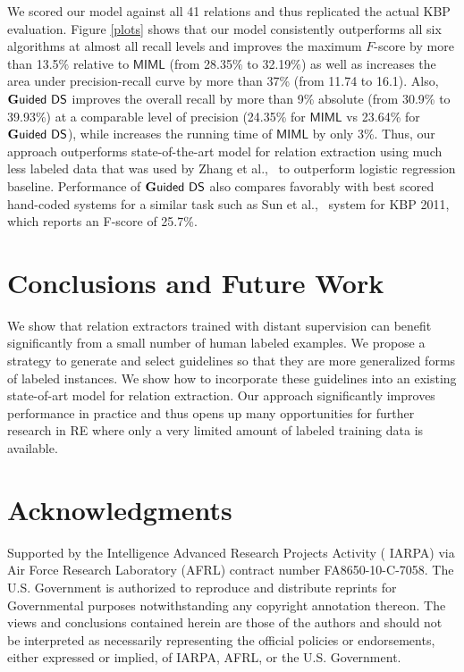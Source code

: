 \documentclass[11pt]{article}
\begin{document}
We scored our model against all 41 relations and thus replicated the actual KBP evaluation. 
Figure \ref{plots} shows that our model consistently outperforms all six algorithms at almost all recall levels and 
improves the maximum $F$-score by more than 13.5$\%$ relative to $\mathsf{MIML}$ (from 28.35$\%$
to 32.19$\%$) as well as increases the area under precision-recall curve by more than 37\% (from 11.74 to 16.1).
Also, $\mathsf{{\bf G}uided\ DS}$ improves the overall recall by more than 9\% absolute 
(from 30.9\% to 39.93\%) at a comparable level of precision 
(24.35\% for $\mathsf{MIML}$ vs 23.64\% for  $\mathsf{{\bf G}uided\ DS}$), while increases the running time of $\mathsf{MIML}$ by only 3\%.
Thus, our approach outperforms state-of-the-art model for relation extraction using much less labeled data
that was used by Zhang et al.,~ to outperform logistic regression baseline.
Performance of $\mathsf{{\bf G}uided\ DS}$ also compares favorably with best scored hand-coded systems for a similar task such as Sun et al.,~ 
system for KBP 2011, which reports an F-score of 25.7\%. 


\section{Conclusions and Future Work}

We show that relation extractors trained with distant supervision can benefit significantly from a small number of human labeled examples. We propose a strategy to generate and select guidelines so that they are more generalized 
forms of labeled instances. We show how to incorporate these guidelines into an existing state-of-art model for relation extraction. Our approach significantly improves performance in practice and thus opens up many opportunities 
for further research in RE where only a very limited amount of labeled training data is available.

\vspace{5mm}
\section*{Acknowledgments}
Supported by the Intelligence Advanced Research Projects Activity (
IARPA) via Air Force Research Laboratory (AFRL) contract number FA8650-10-C-7058. The U.S. Government is authorized to reproduce and distribute reprints for Governmental purposes notwithstanding any copyright annotation thereon. The views and conclusions contained herein are those of the authors and should not be interpreted as necessarily representing the official policies or endorsements, either expressed or implied, of IARPA, AFRL, or the U.S. Government.
\newpage

\nocite{*}



\end{document}
